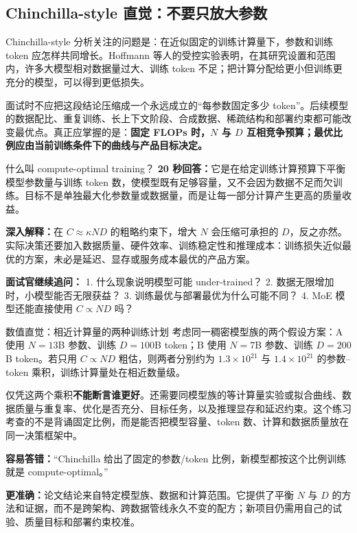 \subsection{Chinchilla-style 直觉：不要只放大参数}

Chinchilla-style 分析关注的问题是：在近似固定的训练计算量下，参数和训练 token 应怎样共同增长。Hoffmann 等人的受控实验表明，在其研究设置和范围内，许多大模型相对数据量过大、训练 token 不足；把计算分配给更小但训练更充分的模型，可以得到更低损失。

面试时不应把这段结论压缩成一个永远成立的“每参数固定多少 token”。后续模型的数据配比、重复训练、长上下文阶段、合成数据、稀疏结构和部署约束都可能改变最优点。真正应掌握的是：\textbf{固定 FLOPs 时，$N$ 与 $D$ 互相竞争预算；最优比例应由当前训练条件下的曲线与产品目标决定。}

\begin{interviewbox}{什么叫 compute-optimal training？}
\textbf{20 秒回答：}它是在给定训练计算预算下平衡模型参数量与训练 token 数，使模型既有足够容量，又不会因为数据不足而欠训练。目标不是单独最大化参数量或数据量，而是让每一部分计算产生更高的质量收益。

\textbf{深入解释：}在 $C\approx\kappa ND$ 的粗略约束下，增大 $N$ 会压缩可承担的 $D$，反之亦然。实际决策还要加入数据质量、硬件效率、训练稳定性和推理成本：训练损失近似最优的方案，未必是延迟、显存或服务成本最优的产品方案。

\textbf{面试官继续追问：}
1. 什么现象说明模型可能 under-trained？
2. 数据无限增加时，小模型能否无限获益？
3. 训练最优与部署最优为什么可能不同？
4. MoE 模型还能直接使用 $C\propto ND$ 吗？
\end{interviewbox}

\begin{examplebox}{数值直觉：相近计算量的两种训练计划}
考虑同一稠密模型族的两个假设方案：A 使用 $N=13$B 参数、训练 $D=100$B token；B 使用 $N=7$B 参数、训练 $D=200$B token。若只用 $C\propto ND$ 粗估，则两者分别约为 $1.3\times10^{21}$ 与 $1.4\times10^{21}$ 的参数--token 乘积，训练计算量处在相近数量级。

仅凭这两个乘积\textbf{不能断言谁更好}。还需要同模型族的等计算量实验或拟合曲线、数据质量与重复率、优化是否充分、目标任务，以及推理显存和延迟约束。这个练习考查的不是背诵固定比例，而是能否把模型容量、token 数、计算和数据质量放在同一决策框架中。
\end{examplebox}

\begin{wrongbox}
\textbf{容易答错：}“Chinchilla 给出了固定的参数/token 比例，新模型都按这个比例训练就是 compute-optimal。”

\textbf{更准确：}论文结论来自特定模型族、数据和计算范围。它提供了平衡 $N$ 与 $D$ 的方法和证据，而不是跨架构、跨数据管线永久不变的配方；新项目仍需用自己的试验、质量目标和部署约束校准。
\end{wrongbox}

